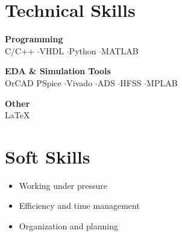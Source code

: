 \documentclass[a4paper,11pt]{article}
\begin{document}
\vspace{-2pt}
\begin{minipage}[t]{0.48\linewidth}

\section{Technical Skills}

\textbf{Programming}\\
C/C++ \enspace$\cdot$\enspace VHDL \enspace$\cdot$\enspace Python \enspace$\cdot$\enspace MATLAB

\vspace{6pt}
\textbf{EDA \& Simulation Tools}\\
OrCAD PSpice \enspace$\cdot$\enspace Vivado \enspace$\cdot$\enspace ADS \enspace$\cdot$\enspace HFSS \enspace$\cdot$\enspace MPLAB

\vspace{6pt}
\textbf{Other}\\
\LaTeX

\section{Soft Skills}

\begin{itemize}[nosep, leftmargin=1.2em, itemsep=2pt]
  \item Working under pressure
  \item Efficiency and time management
  \item Organization and planning
\end{itemize}

\end{minipage}%
\hfill
\end{document}
